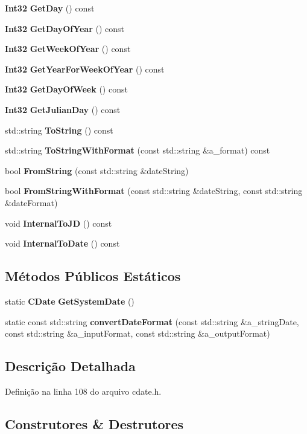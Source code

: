 \begin{DoxyCompactItemize}
\item 
{\bf Int32} {\bf Get\+Day} () const 
\item 
{\bf Int32} {\bf Get\+Day\+Of\+Year} () const 
\item 
{\bf Int32} {\bf Get\+Week\+Of\+Year} () const 
\item 
{\bf Int32} {\bf Get\+Year\+For\+Week\+Of\+Year} () const 
\item 
{\bf Int32} {\bf Get\+Day\+Of\+Week} () const 
\item 
{\bf Int32} {\bf Get\+Julian\+Day} () const 
\item 
std\+::string {\bf To\+String} () const 
\item 
std\+::string {\bf To\+String\+With\+Format} (const std\+::string \&a\+\_\+format) const 
\item 
bool {\bf From\+String} (const std\+::string \&date\+String)
\item 
bool {\bf From\+String\+With\+Format} (const std\+::string \&date\+String, const std\+::string \&date\+Format)
\item 
void {\bf Internal\+To\+JD} () const 
\item 
void {\bf Internal\+To\+Date} () const 
\end{DoxyCompactItemize}
\subsection*{Métodos Públicos Estáticos}
\begin{DoxyCompactItemize}
\item 
static {\bf C\+Date} {\bf Get\+System\+Date} ()
\item 
static const std\+::string {\bf convert\+Date\+Format} (const std\+::string \&a\+\_\+string\+Date, const std\+::string \&a\+\_\+input\+Format, const std\+::string \&a\+\_\+output\+Format)
\end{DoxyCompactItemize}


\subsection{Descrição Detalhada}


Definição na linha 108 do arquivo cdate.\+h.



\subsection{Construtores \& Destrutores}
